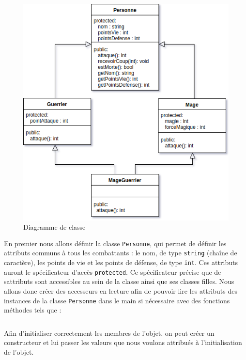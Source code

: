 \begin{figure}[H]
  \centering
  \includegraphics[width=400pt]{./cpp/Pictures/tp9+10-inheritance}
  \caption{Diagramme de classe}
  \label{Diagramme de classe}
\end{figure}

En premier nous allons définir la classe \texttt{Personne}, qui permet de définir les attributs communs à tous les combattants : le nom, de type \texttt{string} (chaîne de caractère), les points de vie et les points de défense, de type \texttt{int}. Ces attributs auront le spécificateur d’accès \texttt{protected}. Ce spécificateur précise que de sattributs sont accessibles au sein de la classe ainsi que ses classes filles.
Nous allons donc créer des accesseurs en lecture afin de pouvoir lire les attributs des instances de la classe \texttt{Personne} dans le main si nécessaire avec des fonctions méthodes tels que :

\inputminted[linenos,firstline=33,lastline=35]{cpp}{../sources/cpp/TP9-10/Personne.cpp}

Afin d'initialiser correctement les membres de l'objet, on peut créer un constructeur et lui passer les valeurs que nous voulons attribués à l'initialisation de l'objet.

\inputminted[linenos,firstline=9,lastline=13]{cpp}{../sources/cpp/TP9-10/Personne.cpp}

